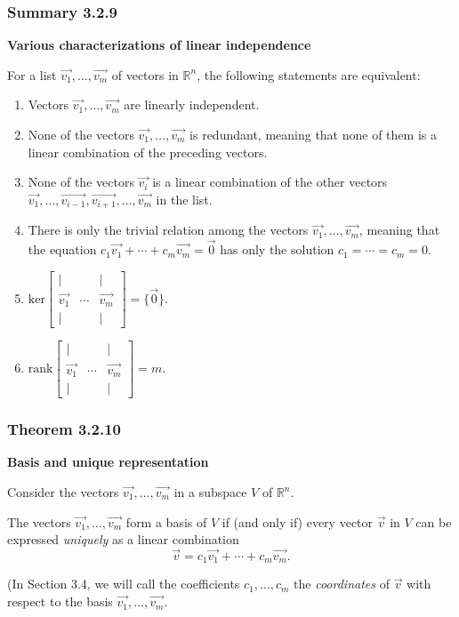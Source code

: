 \documentclass{report}
\begin{document}
\subsubsection*{Summary 3.2.9}
\par\noindent\textbf{Various characterizations of linear independence}
\par\noindent For a list $\vec{v_{1}},\ldots{},\vec{v_{m}}$ of vectors in $\mathbb{R}^{n}$, the following statements are equivalent:
\renewcommand{\labelenumi}{\textbf{\roman{enumi}.}}
\begin{enumerate}
\item Vectors $\vec{v_{1}},\ldots{},\vec{v_{m}}$ are linearly independent.
\item None of the vectors $\vec{v_{1}},\ldots{},\vec{v_{m}}$ is redundant, meaning that none of them is a linear combination of the preceding vectors.
\item None of the vectors $\vec{v_{i}}$ is a linear combination of the other vectors $\vec{v_{1}},\ldots{},\vec{v_{i-1}},\vec{v_{i+1}},\ldots{},\vec{v_{m}}$ in the list.
\item There is only the trivial relation among the vectors $\vec{v_{1}},\ldots{},\vec{v_{m}}$, meaning that the equation $c_{1}\vec{v_{1}}+\cdots{}+c_{m}\vec{v_{m}}=\vec{0}$ has only the solution $c_{1}=\cdots{}=c_{m}=0$.
\item $\displaystyle\textrm{ker}\left[\begin{array}{ccc} |& &|\\ \vec{v_{1}}&\cdots{}&\vec{v_{m}}\\ |& &|\end{array}\right]=\{\vec{0}\}$.
\item $\displaystyle\textrm{rank}\left[\begin{array}{ccc} |& &|\\ \vec{v_{1}}&\cdots{}&\vec{v_{m}}\\ |& &|\end{array}\right]=m$.
\end{enumerate}
\subsubsection*{Theorem 3.2.10}
\par\noindent\textbf{Basis and unique representation}
\par\noindent Consider the vectors $\vec{v_{1}},\ldots{},\vec{v_{m}}$ in a subspace $V$ of $\mathbb{R}^{n}$.
\par\noindent The vectors $\vec{v_{1}},\ldots{},\vec{v_{m}}$ form a basis of $V$ if (and only if) every vector $\vec{v}$ in $V$ can be expressed \textit{uniquely} as a linear combination
\[\vec{v}=c_{1}\vec{v_{1}}+\cdots{}+c_{m}\vec{v_{m}}.\]
\par\noindent (In Section 3.4, we will call the coefficients $c_{1},\ldots{},c_{m}$ the \textit{coordinates} of $\vec{v}$ with respect to the basis $\vec{v_{1}},\ldots{},\vec{v_{m}}$.
\pagebreak
\end{document}
